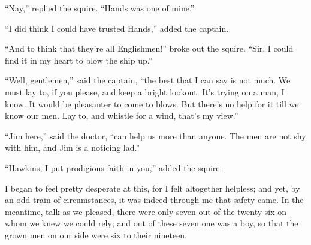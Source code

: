 \enquote{Nay,} replied the squire. \enquote{Hands was one of mine.}

\enquote{I did think I could have trusted Hands,} added the captain.

\enquote{And to think that they’re all Englishmen!} broke out the squire. \enquote{Sir, I could find it in my heart to blow the ship up.}

\enquote{Well, gentlemen,} said the captain, \enquote{the best that I can say is not much. We must lay to, if you please, and keep a bright lookout. It’s trying on a man, I know. It would be pleasanter to come to blows. But there’s no help for it till we know our men. Lay to, and whistle for a wind, that’s my view.}

\enquote{Jim here,} said the doctor, \enquote{can help us more than anyone. The men are not shy with him, and Jim is a noticing lad.}

\enquote{Hawkins, I put prodigious faith in you,} added the squire.

I began to feel pretty desperate at this, for I felt altogether helpless; and yet, by an odd train of circumstances, it was indeed through me that safety came. In the meantime, talk as we pleased, there were only seven out of the twenty-six on whom we knew we could rely; and out of these seven one was a boy, so that the grown men on our side were six to their nineteen.
